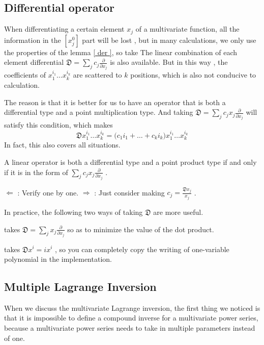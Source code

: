 {\subsection { Differential operator }

When differentiating a certain element $ x_j $ of a multivariate function, all the information in the $ [x_j^ 0 ] $ part will be lost , but in many calculations, we only use the properties of the lemma \ref { der }, so take The linear combination of each element differential $ \mathfrak D= \sum _j c_j \frac { \partial }{ \partial x_j} $ is also available. But in this way , the coefficients of $ x_ 1 ^{i_1} \dots x_k^{i_k} $ are scattered to $ k $ positions, which is also not conducive to calculation.

The reason is that it is better for us to have an operator that is both a differential type and a point multiplication type. And taking $ \mathfrak D = \sum _j c_j x_j \frac { \partial }{ \partial x_j} $ will satisfy this condition, which makes
$$
\mathfrak D x_ 1 ^{i_1} \dots x_k^{i_k} = \mathfrak (c_ 1 i_ 1 + \dots +c_ki_k)x_ 1 ^{i_1} \dots x_k^{i_k}
$$
In fact, this also covers all situations.
\begin { lemma }
A linear operator is both a differential type and a point product type if and only if it is in the form of $ \sum _j c_j x_j \frac { \partial }{ \partial x_j} $ .
\end { lemma }
\begin { proof }
$ \Leftarrow $ : Verify one by one. $ \Rightarrow $ : Just consider making $ c_j = \frac { \mathfrak D x_j}{x_j} $ .
\end { proof }
In practice, the following two ways of taking $ \mathfrak D $ are more useful.
\begin { itemize }
\item takes $ \mathfrak D= \sum _j x_j \frac { \partial }{ \partial x_j} $ so as to minimize the value of the dot product.
\item takes $ \mathfrak D x^i = ix^i $ , so you can completely copy the writing of one-variable polynomial in the implementation.
\end { itemize }

\subsection { Multiple Lagrange Inversion }

When we discuss the multivariate Lagrange inversion, the first thing we noticed is that it is impossible to define a compound inverse for a multivariate power series, because a multivariate power series needs to take in multiple parameters instead of one.

}
